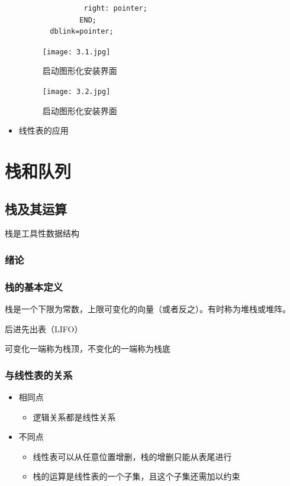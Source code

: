 \documentclass[AutoFakeBold]{LZUThesis2007}
\begin{document}
\begin{itemize}
\begin{itemize}
\begin{lstlisting}
			right: pointer;
		   END;
	dblink=pointer;
\end{lstlisting}
		\end{itemize}
\begin{figure}[H]
    \centering
    \texttt{[image: 3.1.jpg]}
    \caption{启动图形化安装界面}
    \label{fig_install_texlive}
\end{figure}
\begin{figure}[H]
    \centering
    \texttt{[image: 3.2.jpg]}
    \caption{启动图形化安装界面}
    \label{fig_install_texlive}
\end{figure}
	\item 线性表的应用
\end{itemize}


\chapter{栈和队列}
	\section{栈及其运算}
	栈是工具性数据结构
		\subsection{绪论}
		\subsection{栈的基本定义}
		栈是一个下限为常数，上限可变化的向量（或者反之）。有时称为堆栈或堆阵。

		后进先出表（LIFO）

		可变化一端称为栈顶，不变化的一端称为栈底

		\subsection{与线性表的关系}
			\begin{itemize}
				\item 相同点
					\begin{itemize}
						\item 逻辑关系都是线性关系
					\end{itemize}

				\item 不同点
					\begin{itemize}
						\item 线性表可以从任意位置增删，栈的增删只能从表尾进行
						\item 栈的运算是线性表的一个子集，且这个子集还需加以约束
					\end{itemize}

			\end{itemize}
\end{document}
